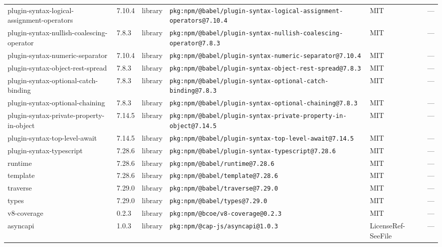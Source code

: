 \documentclass[11pt,a4paper]{article}
\begin{document}
\begin{longtable}{|p{4cm}|p{2cm}|p{1.6cm}|p{5cm}|p{1.5cm}|p{3.5cm}|}
\raggedright plugin-syntax-logical-assignment-operators & 7.10.4 & library & \small\texttt{pkg:npm/@babel/plugin-syntax-logical-assignment-operators@7.10.4} & MIT & \small — \\
\raggedright plugin-syntax-nullish-coalescing-operator & 7.8.3 & library & \small\texttt{pkg:npm/@babel/plugin-syntax-nullish-coalescing-operator@7.8.3} & MIT & \small — \\
\raggedright plugin-syntax-numeric-separator & 7.10.4 & library & \small\texttt{pkg:npm/@babel/plugin-syntax-numeric-separator@7.10.4} & MIT & \small — \\
\raggedright plugin-syntax-object-rest-spread & 7.8.3 & library & \small\texttt{pkg:npm/@babel/plugin-syntax-object-rest-spread@7.8.3} & MIT & \small — \\
\raggedright plugin-syntax-optional-catch-binding & 7.8.3 & library & \small\texttt{pkg:npm/@babel/plugin-syntax-optional-catch-binding@7.8.3} & MIT & \small — \\
\raggedright plugin-syntax-optional-chaining & 7.8.3 & library & \small\texttt{pkg:npm/@babel/plugin-syntax-optional-chaining@7.8.3} & MIT & \small — \\
\raggedright plugin-syntax-private-property-in-object & 7.14.5 & library & \small\texttt{pkg:npm/@babel/plugin-syntax-private-property-in-object@7.14.5} & MIT & \small — \\
\raggedright plugin-syntax-top-level-await & 7.14.5 & library & \small\texttt{pkg:npm/@babel/plugin-syntax-top-level-await@7.14.5} & MIT & \small — \\
\raggedright plugin-syntax-typescript & 7.28.6 & library & \small\texttt{pkg:npm/@babel/plugin-syntax-typescript@7.28.6} & MIT & \small — \\
\raggedright runtime & 7.28.6 & library & \small\texttt{pkg:npm/@babel/runtime@7.28.6} & MIT & \small — \\
\raggedright template & 7.28.6 & library & \small\texttt{pkg:npm/@babel/template@7.28.6} & MIT & \small — \\
\raggedright traverse & 7.29.0 & library & \small\texttt{pkg:npm/@babel/traverse@7.29.0} & MIT & \small — \\
\raggedright types & 7.29.0 & library & \small\texttt{pkg:npm/@babel/types@7.29.0} & MIT & \small — \\
\raggedright v8-coverage & 0.2.3 & library & \small\texttt{pkg:npm/@bcoe/v8-coverage@0.2.3} & MIT & \small — \\
\raggedright asyncapi & 1.0.3 & library & \small\texttt{pkg:npm/@cap-js/asyncapi@1.0.3} & LicenseRef-SeeFile & \small — \\

\end{longtable}
\end{document}
